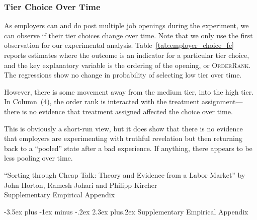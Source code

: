 \documentclass[12pt]{article}
\makeatletter
\renewcommand{\thesection}{\Roman{section}}
\renewcommand{\thesubsection}{\Roman{section}.\Alph{subsection}}
\renewcommand{\section}{%
  \@startsection{section}{1}{\z@}%
  {-3.5ex plus -1ex minus -.2ex}%
  {2.3ex plus.2ex}%
  {\normalfont\Large\bfseries}%
}
\makeatother
\begin{document}
\subsubsection{Tier Choice Over Time} 
\label{online_app:choice_over_time}

As employers can and do post multiple job openings during the experiment, we can observe if their tier choices change over time.
Note that we only use the first observation for our experimental analysis. 
Table~\ref{tab:employer_choice_fe} reports estimates where the outcome is an indicator for a particular tier choice, and the key explanatory variable is the ordering of the opening, or \textsc{OrderRank}.
The regressions show no change in probability of selecting low tier over time.

However, there is some movement away from the medium tier, into the high tier.
In Column~(4), the order rank is interacted with the treatment assignment---there is no evidence that treatment assigned affected the choice over time.

 

This is obviously a short-run view, but it does show that there is no evidence that employers are experimenting with truthful revelation but then returning back to a ``pooled'' state after a bad experience.
If anything, there appears to be less pooling over time. 






\clearpage

\appendix

\renewcommand{\thesection}{S\Alph{section}}
\renewcommand{\thesubsection}{S\Alph{section}.\arabic{subsection}}
\setcounter{section}{0} %
\setcounter{page}{1}

\begin{centering}
    \Large{``Sorting through Cheap Talk: Theory and Evidence from a Labor Market'' by John Horton, Ramesh Johari and Philipp Kircher \\ \bigskip 
    \LARGE Supplementary Empirical Appendix
    \\ \bigskip}
\end{centering}


\section{Supplementary Empirical Appendix}
\end{document}
